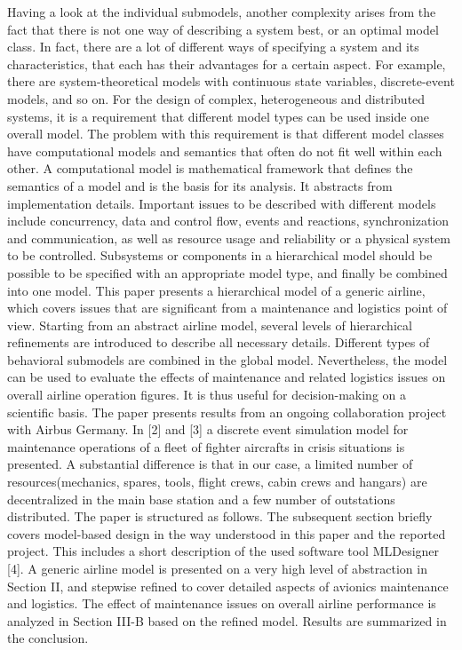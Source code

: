     Having a look at the individual submodels, another complexity arises from the fact that there is not one way of
    describing a system best, or an optimal model class. In fact,
    there are a lot of different ways of specifying a system and
    its characteristics, that each has their advantages for a certain
    aspect. For example, there are system-theoretical models with
    continuous state variables, discrete-event models, and so on.
    For the design of complex, heterogeneous and distributed systems, it is a requirement that different model types can be used
    inside one overall model. The problem with this requirement
    is that different model classes have computational models and
    semantics that often do not fit well within each other. A
    computational model is mathematical framework that defines
    the semantics of a model and is the basis for its analysis.
    It abstracts from implementation details. Important issues to
    be described with different models include concurrency, data
    and control flow, events and reactions, synchronization and
    communication, as well as resource usage and reliability or a
    physical system to be controlled. Subsystems or components
    in a hierarchical model should be possible to be specified with
    an appropriate model type, and finally be combined into one
    model.
    This paper presents a hierarchical model of a generic airline,
    which covers issues that are significant from a maintenance
    and logistics point of view. Starting from an abstract airline
    model, several levels of hierarchical refinements are introduced
    to describe all necessary details. Different types of behavioral
    submodels are combined in the global model. Nevertheless,
    the model can be used to evaluate the effects of maintenance
    and related logistics issues on overall airline operation figures.
    It is thus useful for decision-making on a scientific basis. The
    paper presents results from an ongoing collaboration project
    with Airbus Germany. In [2] and [3] a discrete event simulation
    model for maintenance operations of a fleet of fighter aircrafts
    in crisis situations is presented. A substantial difference is that
    in our case, a limited number of resources(mechanics, spares,
    tools, flight crews, cabin crews and hangars) are decentralized
    in the main base station and a few number of outstations
    distributed.
    The paper is structured as follows. The subsequent section
    briefly covers model-based design in the way understood in
    this paper and the reported project. This includes a short
    description of the used software tool MLDesigner [4]. A
    generic airline model is presented on a very high level of
    abstraction in Section II, and stepwise refined to cover detailed
    aspects of avionics maintenance and logistics. The effect of
    maintenance issues on overall airline performance is analyzed
    in Section III-B based on the refined model. Results are
    summarized in the conclusion.


